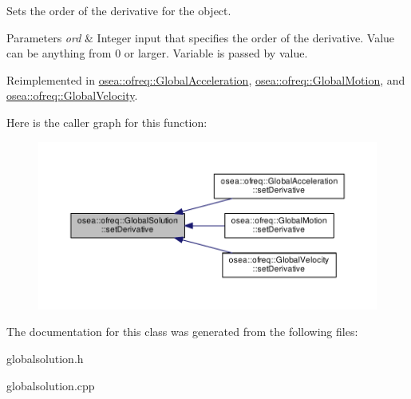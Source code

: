 Sets the order of the derivative for the object. 


\begin{DoxyParams}{Parameters}
{\em ord} & Integer input that specifies the order of the derivative. Value can be anything from 0 or larger. Variable is passed by value. \\
\hline
\end{DoxyParams}


Reimplemented in \hyperlink{classosea_1_1ofreq_1_1_global_acceleration_a14a041ea42d4c1bc10211c9a44aa3431}{osea\-::ofreq\-::\-Global\-Acceleration}, \hyperlink{classosea_1_1ofreq_1_1_global_motion_a15a8c0d57ffedf65a1cd84154cdaa6ae}{osea\-::ofreq\-::\-Global\-Motion}, and \hyperlink{classosea_1_1ofreq_1_1_global_velocity_a11229a6dbc7f85f3c321b5eddb127f10}{osea\-::ofreq\-::\-Global\-Velocity}.



Here is the caller graph for this function\-:\nopagebreak
\begin{figure}[H]
\begin{center}
\leavevmode
\includegraphics[width=350pt]{classosea_1_1ofreq_1_1_global_solution_a537163391f1f55d073720b20f69acfa5_icgraph}
\end{center}
\end{figure}




The documentation for this class was generated from the following files\-:\begin{DoxyCompactItemize}
\item 
globalsolution.\-h\item 
globalsolution.\-cpp\end{DoxyCompactItemize}
